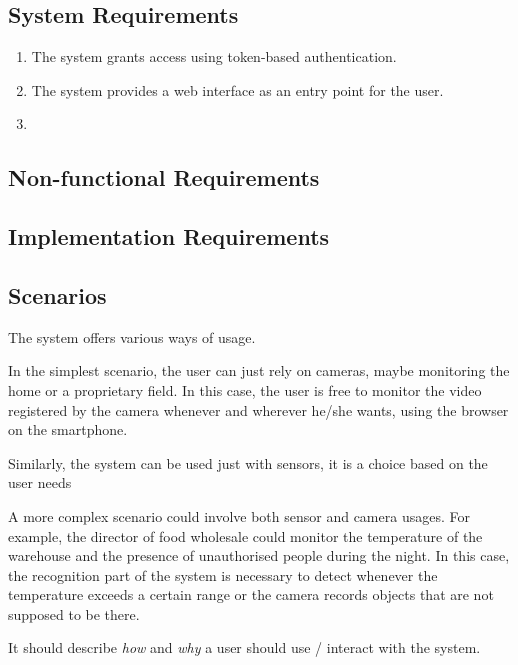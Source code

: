 \documentclass{scrartcl}
\begin{document}
    \subsection{System Requirements}\label{subsec:system-requirements}
    \begin{enumerate}
        \item \label{itm:sys-1} The system grants access using token-based authentication.
        \item \label{itm:sys-2} The system provides a web interface as an entry point for the user.
        \item
    \end{enumerate}

    \subsection{Non-functional Requirements}

    \subsection{Implementation Requirements}

    \begin{enumerate}
    \end{enumerate}


    \subsection{Scenarios}
    The system offers various ways of usage.

    In the simplest scenario, the user can just rely on cameras, maybe monitoring
    the home or a proprietary field.
    In this case, the user is free to monitor the video registered by the camera whenever and wherever he/she wants,
    using the browser on the smartphone.

    Similarly, the system can be used just with sensors, it is a choice based on the user needs

    A more complex scenario could involve both sensor and camera usages.
    For example, the director of food wholesale could monitor the temperature of the warehouse and the presence of
    unauthorised people during the night.
    In this case, the recognition part of the system is necessary to detect whenever the
    temperature exceeds a certain range or the camera records objects that are not supposed to be there.

%
    It should describe \emph{how} and \emph{why} a user should use / interact with the system.
\end{document}
